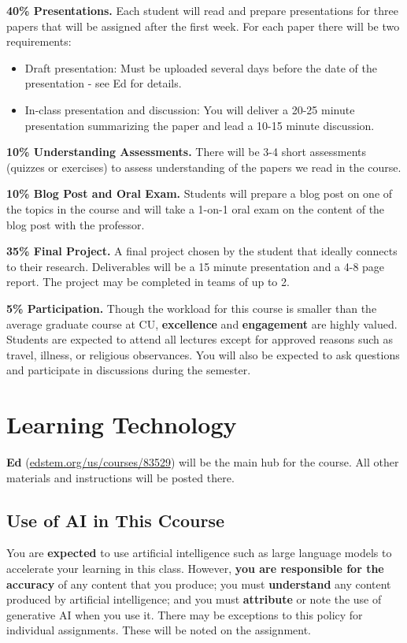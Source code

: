 \documentclass[9pt]{article}
\begin{document}
\textbf{40\% Presentations.}
Each student will read and prepare presentations for three papers that will be assigned after the first week. For each paper there will be two requirements:
\begin{itemize}[nosep]
    \item Draft presentation: Must be uploaded several days before the date of the presentation - see Ed for details.
    \item In-class presentation and discussion: You will deliver a 20-25 minute presentation summarizing the paper and lead a 10-15 minute discussion.
\end{itemize}

\textbf{10\% Understanding Assessments.}
There will be 3-4 short assessments (quizzes or exercises) to assess understanding of the papers we read in the course.

\textbf{10\% Blog Post and Oral Exam.}
Students will prepare a blog post on one of the topics in the course and will take a 1-on-1 oral exam on the content of the blog post with the professor.

\textbf{35\% Final Project.}
A final project chosen by the student that ideally connects to their research. Deliverables will be a 15 minute presentation and a 4-8 page report. The project may be completed in teams of up to 2.

\textbf{5\% Participation.}
Though the workload for this course is smaller than the average graduate course at CU, \textbf{excellence} and \textbf{engagement} are highly valued. Students are expected to attend all lectures except for approved reasons such as travel, illness, or religious observances. You will also be expected to ask questions and participate in discussions during the semester.

\section*{Learning Technology}

\textbf{Ed} (\href{https://edstem.org/us/courses/83529}{edstem.org/us/courses/83529}) will be the main hub for the course. All other materials and instructions will be posted there.

\subsection*{Use of AI in This Ccourse}

You are \textbf{expected} to use artificial intelligence such as large language models to accelerate your learning in this class. However, \textbf{you are responsible for the accuracy} of any content that you produce; you must \textbf{understand} any content produced by artificial intelligence; and you must \textbf{attribute} or note the use of generative AI when you use it. There may be exceptions to this policy for individual assignments. These will be noted on the assignment.
\end{document}
